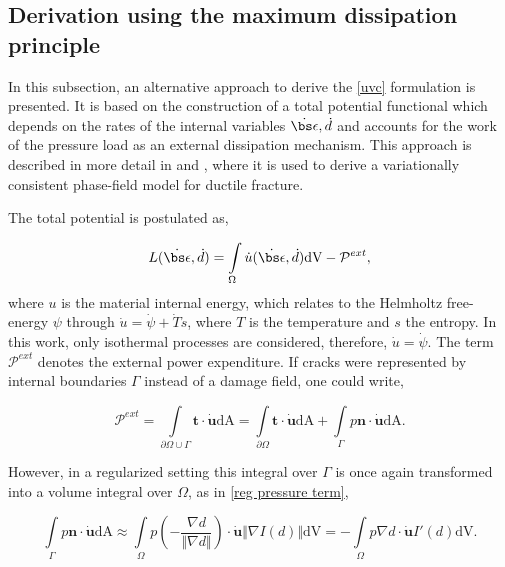 \subsection{Derivation using the maximum dissipation principle}\label{dyn_derivation}

In this subsection, an alternative approach to derive the \eqref{uvc} formulation  is presented. It is based on the construction of a total potential functional which depends on the rates of the internal variables $\dot{\bs\epsilon},\dot{d}$ and accounts for  the work of the pressure load as an external dissipation mechanism. This approach is described in more detail in \cite{hu2021variationalpaper} and \cite{hu2021variationalthesis}, where it is used to derive a variationally consistent phase-field model for ductile fracture. 

The total potential is postulated as,

\begin{equation}\label{total potential}
    L(\dot{\bs\epsilon},\dot{d}) = \int\limits_{\Omega} \dot{u}(\dot{\bs\epsilon},\dot{d}) \text{dV} - \mathcal{P}^{ext}, 
\end{equation}
where $u$ is the material internal energy, which relates to the Helmholtz free-energy $\psi$ through $\dot{u} = \dot{\psi} + \dot{T}s$, where $T$ is the temperature and $s$ the entropy. 
In this work, only isothermal processes are considered, therefore, $\dot{u} = \dot{\psi}$. The term $\mathcal{P}^{ext}$ denotes the external power expenditure. If cracks were represented by internal boundaries $\Gamma$ instead of a damage field, one could write,

\begin{equation}\label{power expenditure}
    \mathcal{P}^{ext} = \int\limits_{\partial \Omega \cup \Gamma} \textbf{t}\cdot\dot{\textbf{u}} \text{dA} = \int\limits_{\partial \Omega} \textbf{t}\cdot\dot{\textbf{u}}\text{dA} + \int\limits_{\Gamma} p\textbf{n}\cdot\dot{\textbf{u}} \text{dA}.
\end{equation}

\noindent However, in a regularized setting this integral over $\Gamma$ is once again transformed into a volume integral over $\Omega$, as in \eqref{reg pressure term}, 

\begin{equation}\label{reg power expenditure}
    \int\limits_{\Gamma} p\textbf{n}\cdot\dot{\textbf{u}} \text{dA} \approx \int\limits_{\Omega} p \left( -\frac{\nabla d}{\Vert\nabla d\Vert} \right)\cdot\dot{\textbf{u}} \Vert\nabla I(d)\Vert\text{dV} = 
    -\int\limits_{\Omega}p\nabla d \cdot\dot{\textbf{u}} I'(d) \text{dV}.
\end{equation}

